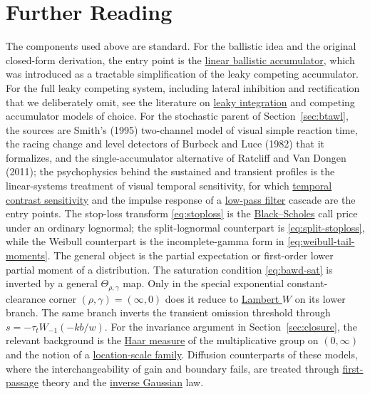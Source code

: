 \documentclass[12pt]{article}
\theoremstyle{remark}
\begin{document}
\section{Further Reading}
The components used above are standard. For the ballistic idea and the original closed-form derivation, the entry point is the \href{https://en.wikipedia.org/wiki/Linear_ballistic_accumulator}{linear ballistic accumulator}, which was introduced as a tractable simplification of the leaky competing accumulator. For the full leaky competing system, including lateral inhibition and rectification that we deliberately omit, see the literature on \href{https://en.wikipedia.org/wiki/Leaky_integrate-and-fire}{leaky integration} and competing accumulator models of choice. For the stochastic parent of Section~\ref{sec:btawl}, the sources are Smith's (1995) two-channel model of visual simple reaction time, the racing change and level detectors of Burbeck and Luce (1982) that it formalizes, and the single-accumulator alternative of Ratcliff and Van Dongen (2011); the psychophysics behind the sustained and transient profiles is the linear-systems treatment of visual temporal sensitivity, for which \href{https://en.wikipedia.org/wiki/Temporal_contrast_sensitivity_function}{temporal contrast sensitivity} and the impulse response of a \href{https://en.wikipedia.org/wiki/Low-pass_filter}{low-pass filter} cascade are the entry points. The stop-loss transform \eqref{eq:stoploss} is the \href{https://en.wikipedia.org/wiki/Black-Scholes_model}{Black--Scholes} call price under an ordinary lognormal; the split-lognormal counterpart is
\eqref{eq:split-stoploss}, while the Weibull counterpart is the incomplete-gamma
form in \eqref{eq:weibull-tail-moments}. The general object is the partial expectation or first-order lower partial moment of a distribution. The saturation condition
\eqref{eq:bawd-sat} is inverted by a general $\Theta_{\rho,\gamma}$ map. Only
in the special exponential constant-clearance corner $(\rho,\gamma)=(\infty,0)$ does it reduce to \href{https://en.wikipedia.org/wiki/Lambert_W_function}{Lambert $W$} on its lower branch.  The same branch inverts the transient omission threshold through $s=-\tau_tW_{-1}(-kb/w)$.  For the invariance argument in Section~\ref{sec:closure}, the relevant background is the \href{https://en.wikipedia.org/wiki/Haar_measure}{Haar measure} of the multiplicative group on $(0,\infty)$ and the notion of a \href{https://en.wikipedia.org/wiki/Location-scale_family}{location-scale family}. Diffusion counterparts of these models, where the interchangeability of gain and boundary fails, are treated through \href{https://en.wikipedia.org/wiki/Hitting_time}{first-passage} theory and the \href{https://en.wikipedia.org/wiki/Inverse_Gaussian_distribution}{inverse Gaussian} law.
\end{document}
